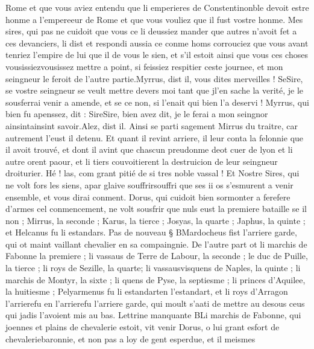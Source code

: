 \documentclass{article}
\begin{document}
\begin{pages}
   Rome et que vous aviez entendu que li emperieres de 
   Constentinonble devoit estre honme a l’empereeur de 
   Rome et que vous vouliez que il fust vostre honme. Mes sires, 
      qui pas ne cuidoit que vous ce li deussiez mander que autres n’avoit fet a ces devanciers, 
      li dist et respondi 
      aussia ce 
   conme homs corrouciez que vous avant tenriez l’empire de lui que il de vous le sien, 
      et s’il estoit ainsi que vous ces choses vousissiezvousissez mettre a 
      point, si feissiez respitier ceste journee, et mon seingneur le feroit de l’autre partie.Myrrus, dist il, vous dites merveilles ! 
      SeSire, se vostre seingneur se veult 
      mettre devers moi tant que jl’en sache la 
      verité, je le sousferrai venir a amende, et se ce non, 
      si l’enait qui bien l’a deservi !
   Myrrus, qui bien fu apenssez, dit :
   SireSire, bien avez dit, je le ferai a 
      mon seingnor ainsintainsint savoir.Alez, dist il. \pend
\pstart Ainsi se parti sagement Mirrus du 
   traitre, car autrement l’eust il detenu. Et quant il revint arriere, il leur conta 
   la felonnie que il avoit trouvé, et dont il avint que chascun preudonme deot 
   cuer de lyon et li autre orent paour, et li tiers couvoitierent la destruicion de leur seingneur droiturier. Hé ! las, com grant pitié
   de si tres noble vassal ! Et Nostre Sires, qui ne volt fors les siens, 
   apar glaive
   souffrirsouffri que ses ii os s’esmurent a venir ensemble, 
   et vous dirai conment. Dorus, qui cuidoit bien sormonter a 
   ferefere d'armes cel 
   conmencement, ne volt sousfrir que nuls eust la premiere bataille se il non ; Mirrus, la seconde ; 
   Karus, la tierce ; Josyas, la quarte ; 
   Japhus, la quinte ; et Helcanus fu li estandars. \pend
\pstart Pas de nouveau § BMardocheus 
   fist l’arriere garde, qui ot maint vaillant chevalier 
   en sa compaingnie. De l’autre part ot li marchis de 
      Fabonne la premiere ; 
   li vassaus de Terre de Labour, 
   la seconde ; le duc de Puille, la tierce ; 
   li roys de Sezille, la quarte; 
   li vassausvisquens de 
      Naples, la quinte ; 
   li marchis de Montyr, la sixte ; 
   li quens de Pyse, la septiesme ; 
   li princes d’Aquilee, la huitiesme ; Pelyarmenus 
   fu li estandarten l'estandart, 
   et li roys d’Arragon 
   l’arrierefu en l'arrierefu l'arriere garde, 
   qui moult s’aati de mettre au desous ceus qui jadis l’avoient mis au bas. \pend
\pstart Lettrine manquante BLi marchis de Fabonne, 
   qui joennes et plains de chevalerie estoit, vit venir Dorus, o lui grant esfort de 
   chevaleriebaronnie, et non pas a loy de gent esperdue, et il meismes 

\end{pages}
\end{document}

